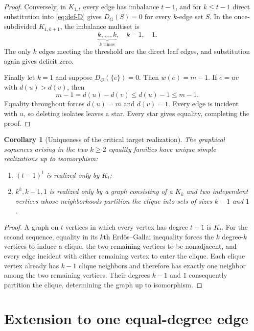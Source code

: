 \documentclass[a4paper,11pt]{amsart}
\numberwithin{equation}{section}
\newtheorem{corollary}[theorem]{Corollary}
\theoremstyle{definition}
\theoremstyle{remark}
\begin{document}
\begin{proof}
Conversely, in $K_{1,t}$ every edge has imbalance $t-1$, and for $k\le t-1$ direct substitution into \eqref{eq:def-D} gives $D_G(S)=0$ for every $k$-edge set $S$.  In the once-subdivided $K_{1,k+1}$, the imbalance multiset is
\begin{equation}
\underbrace{k,\ldots,k}_{k\text{ times}},\quad k-1,\quad1.
\label{eq:subdivided-sequence}
\end{equation}
The only $k$ edges meeting the threshold are the direct leaf edges, and substitution again gives deficit zero.

Finally let $k=1$ and suppose $D_G(\{e\})=0$.  Then $w(e)=m-1$.  If $e=uv$ with $d(u)>d(v)$, then
\[
m-1=d(u)-d(v)\le d(u)-1\le m-1.
\]
Equality throughout forces $d(u)=m$ and $d(v)=1$.  Every edge is incident with $u$, so deleting isolates leaves a star.  Every star gives equality, completing the proof.
\end{proof}

\begin{corollary}[Uniqueness of the critical target realization]\label{cor:target-unique}
The graphical sequences arising in the two $k\ge2$ equality families have unique simple realizations up to isomorphism:
\begin{enumerate}[label=\textup{(\roman*)}]
\item $(t-1)^t$ is realized only by $K_t$;
\item $k^k,k-1,1$ is realized only by a graph consisting of a $K_k$ and two independent vertices whose neighborhoods partition the clique into sets of sizes $k-1$ and $1$.
\end{enumerate}
\end{corollary}

\begin{proof}
A graph on $t$ vertices in which every vertex has degree $t-1$ is $K_t$.  For the second sequence, equality in its $k$th Erd\H{o}s--Gallai inequality forces the $k$ degree-$k$ vertices to induce a clique, the two remaining vertices to be nonadjacent, and every edge incident with either remaining vertex to enter the clique.  Each clique vertex already has $k-1$ clique neighbors and therefore has exactly one neighbor among the two remaining vertices.  Their degrees $k-1$ and $1$ consequently partition the clique, determining the graph up to isomorphism.
\end{proof}

\section{Extension to one equal-degree edge}\label{sec:one-zero}
\end{document}
